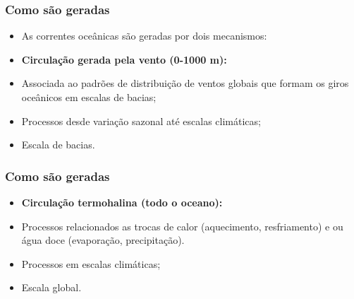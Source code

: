 \begin{frame}
\frametitle{Como são geradas}
  \begin{itemize}[<+-| alert@+>]
    \item As correntes oceânicas são geradas por dois mecanismos:
    \item {\bf Circulação gerada pela vento (0-1000 m):}
    \item Associada ao padrões de distribuição de ventos globais que formam os
          giros oceânicos em escalas de bacias;
    \item Processos desde variação sazonal até escalas climáticas;
    \item Escala de bacias.
   \end{itemize}
\end{frame}


\begin{frame}
\frametitle{Como são geradas}
  \begin{itemize}[<+-| alert@+>]
    \item {\bf Circulação termohalina (todo o oceano):}
    \item Processos relacionados as trocas de calor (aquecimento, resfriamento)
          e ou água doce (evaporação, precipitação).
    \item Processos em escalas climáticas;
    \item Escala global.
   \end{itemize}
\end{frame}

